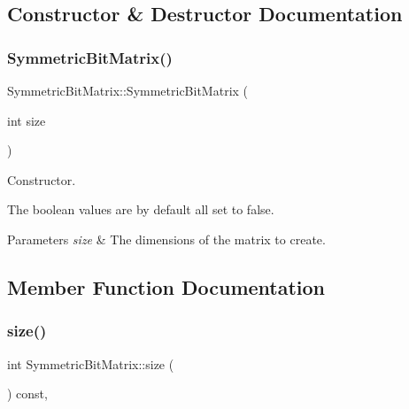 \subsection{Constructor \& Destructor Documentation}
\mbox{\label{class_symmetric_bit_matrix_a828dbcd597cd13390922d863357da3f3}} 
\subsubsection{\texorpdfstring{Symmetric\+Bit\+Matrix()}{SymmetricBitMatrix()}}
{\footnotesize\ttfamily Symmetric\+Bit\+Matrix\+::\+Symmetric\+Bit\+Matrix (\begin{DoxyParamCaption}\item[{int}]{size }\end{DoxyParamCaption})\hspace{0.3cm}{\ttfamily [inline]}}



Constructor. 

The boolean values are by default all set to {\ttfamily false}. 
\begin{DoxyParams}{Parameters}
{\em size} & The dimensions of the matrix to create. \\
\hline
\end{DoxyParams}


\subsection{Member Function Documentation}
\mbox{\label{class_symmetric_bit_matrix_aed948744d70716f6325063ed55a76c6c}} 
\subsubsection{\texorpdfstring{size()}{size()}}
{\footnotesize\ttfamily int Symmetric\+Bit\+Matrix\+::size (\begin{DoxyParamCaption}{ }\end{DoxyParamCaption}) const\hspace{0.3cm}{\ttfamily [inline]}, {\ttfamily [noexcept]}}



